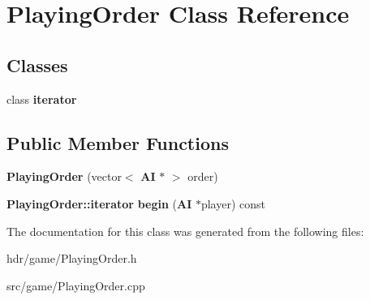 \section{Playing\-Order Class Reference}
\label{class_playing_order}
\subsection*{Classes}
\begin{DoxyCompactItemize}
\item 
class {\bf iterator}
\end{DoxyCompactItemize}
\subsection*{Public Member Functions}
\begin{DoxyCompactItemize}
\item 
{\bfseries Playing\-Order} (vector$<$ {\bf A\-I} $\ast$ $>$ order)\label{class_playing_order_a24bd2c8773f4b26bcd830f6861a3b8da}

\item 
{\bf Playing\-Order\-::iterator} {\bfseries begin} ({\bf A\-I} $\ast$player) const \label{class_playing_order_ae84e1df8d1e7cbce8787895375a1a1f2}

\end{DoxyCompactItemize}


The documentation for this class was generated from the following files\-:\begin{DoxyCompactItemize}
\item 
hdr/game/Playing\-Order.\-h\item 
src/game/Playing\-Order.\-cpp\end{DoxyCompactItemize}
